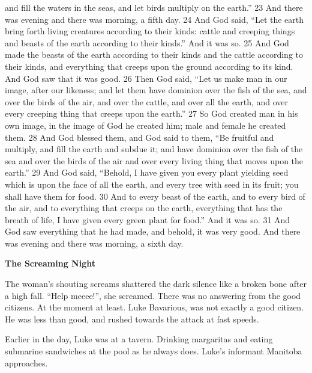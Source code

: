 and fill the waters in the seas, and let birds multiply on the
earth.'' 23 And there was evening and there was morning, a fifth
day. 24 And God said, ``Let the earth bring forth living creatures
according to their kinds: cattle and creeping things and beasts of
the earth according to their kinds.'' And it was so. 25 And God made
the beasts of the earth according to their kinds and the cattle
according to their kinds, and everything that creeps upon the
ground according to its kind. And God saw that it was good. 26 Then
God said, ``Let us make man in our image, after our likeness; and
let them have dominion over the fish of the sea, and over the birds
of the air, and over the cattle, and over all the earth, and over
every creeping thing that creeps upon the earth.'' 27 So God created
man in his own image, in the image of God he created him; male and
female he created them. 28 And God blessed them, and God said to
them, ``Be fruitful and multiply, and fill the earth and subdue it;
and have dominion over the fish of the sea and over the birds of
the air and over every living thing that moves upon the earth.'' 29
And God said, ``Behold, I have given you every plant yielding seed
which is upon the face of all the earth, and every tree with seed
in its fruit; you shall have them for food. 30 And to every beast
of the earth, and to every bird of the air, and to everything that
creeps on the earth, everything that has the breath of life, I have
given every green plant for food.'' And it was so. 31 And God saw
everything that he had made, and behold, it was very good. And
there was evening and there was morning, a sixth day. 

 





{\bf The Screaming Night}



The woman's shouting screams shattered the dark silence like
a broken bone after a high fall. ``Help meeee!'', she
screamed. There was no answering from the good citizens. At the
moment at least. Luke Bavarious, was not exactly a good citizen. He
was less than good, and rushed towards the attack at fast
speeds.



Earlier in the day, Luke was at a tavern. Drinking margaritas and
eating submarine sandwiches at the pool as he always does.
Luke's informant Manitoba approaches.



